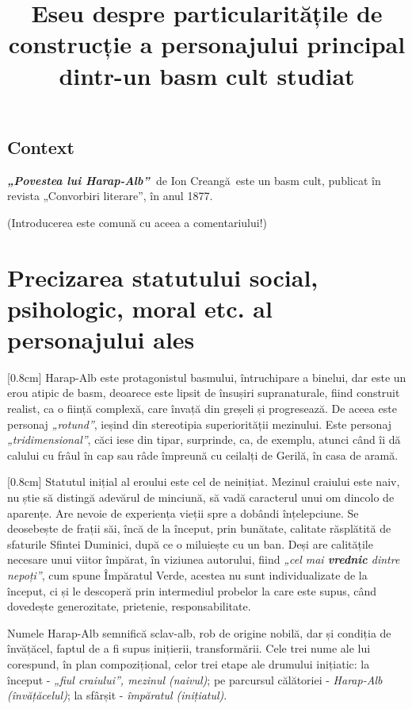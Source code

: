 \documentclass[
12pt,
a4paper
]{article}
\title{Eseu despre particularitățile de construcție a personajului principal dintr-un basm cult studiat}
\date{}   %
\author{} %
\newcommand{\operatitle}{\textbf{\textit{„Povestea lui Harap-Alb”\ }}} %
\newcommand{\operaauthor}{Ion Creangă\ }                               %
\begin{document}
\maketitle %



\subsection{Context}

\operatitle de \operaauthor este un basm cult, publicat în revista „Convorbiri literare”, în anul 1877.

{\footnotesize(Introducerea este comună cu aceea a comentariului!)}

\section{Precizarea statutului social, psihologic, moral etc. al personajului ales}

[0.8cm]
Harap-Alb este protagonistul basmului, întruchipare a binelui, dar este un erou atipic de basm, deoarece este lipsit de însușiri supranaturale, fiind construit realist, ca o ființă complexă, care învață din greșeli și progresează. De aceea este personaj \textit{„rotund”}, ieșind din stereotipia superiorității mezinului. Este personaj \textit{„tridimensional”}, căci iese din tipar, surprinde, ca, de exemplu, atunci când îi dă calului cu frâul în cap sau râde împreună cu ceilalți de Gerilă, în casa de aramă.

[0.8cm]
Statutul inițial al eroului este cel de neinițiat. Mezinul craiului este naiv, nu știe să distingă adevărul de minciună, să vadă caracterul unui om dincolo de aparențe. Are nevoie de experiența vieții spre a dobândi înțelepciune. Se deosebește de frații săi, încă de la început, prin bunătate, calitate răsplătită de sfaturile Sfintei Duminici, după ce o miluiește cu un ban. Deși are calitățile necesare unui viitor împărat, în viziunea autorului, fiind \textit{„cel mai \textbf{vrednic} dintre nepoți”}, cum spune Împăratul Verde, acestea nu sunt individualizate de la început, ci și le descoperă prin intermediul probelor la care este supus, când dovedește generozitate, prietenie, responsabilitate.

Numele Harap-Alb semnifică sclav-alb, rob de origine nobilă, dar și condiția de învățăcel, faptul de a fi supus inițierii, transformării. Cele trei nume ale lui corespund, în plan compozițional, celor trei etape ale drumului inițiatic: la început - \textit{„fiul craiului”, mezinul (naivul)}; pe parcursul călătoriei - \textit{Harap-Alb (învățăcelul)}; la sfârșit - \textit{împăratul (inițiatul)}.
\end{document}

